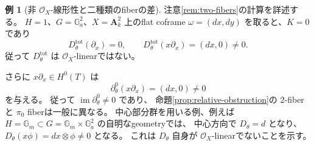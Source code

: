 \documentclass[uplatex,dvipdfmx,11pt]{jsarticle}
\numberwithin{equation}{section}
\theoremstyle{plain}
\theoremstyle{definition}
\newtheorem{example}[theorem]{例}
\theoremstyle{remark}
\DeclareMathOperator{\im}{im}
\newcommand{\OO}{\mathcal O}
\newcommand{\GG}{\mathbb G}
\newcommand{\Dtot}{D_\theta^{\mathrm{tot}}}
\begin{document}
\begin{example}[非 \(\OO_X\)-線形性と二種類のfiberの差]
\label{ex:non-linear}
注意\ref{rem:two-fibers}の計算を詳述する。
\(H=1\)、\(G=\GG_a^2\)、\(X=\mathbf A_k^2\) 上のflat coframe
\(\omega=(dx,dy)\) を取ると、\(K=0\) であり
\[
\Dtot(\partial_x)=0,\qquad
\Dtot(x\partial_x)=(dx,0)\ne0.
\]
従って \(\Dtot\) は \(\OO_X\)-linearではない。

さらに \(x\partial_x\in H^0(T)\) は
\[
\partial_\theta^0(x\partial_x)=(dx,0)\ne0
\]
を与える。
従って \(\im\partial_\theta^0\ne0\) であり、
命題\ref{prop:relative-obstruction}の
\(2\)-fiberと \(\pi_0\) fiberは一般に異なる。
中心部分群を用いる例、例えば
\(H=\GG_m\subset G=\GG_m\times\GG_a^2\) の自明なgeometryでは、
中心方向で \(D_\theta=d\) となり、\(D_\theta(x\phi)=dx\otimes\phi\ne0\) となる。
これは \(D_\theta\) 自身が \(\OO_X\)-linearでないことを示す。
\end{example}
\end{document}
